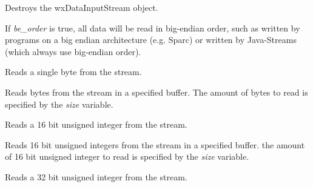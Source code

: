 




Destroys the wxDataInputStream object.



If {\it be\_order} is true, all data will be read in big-endian
order, such as written by programs on a big endian architecture 
(e.g. Sparc) or written by Java-Streams (which always use 
big-endian order).
  


Reads a single byte from the stream.


Reads bytes from the stream in a specified buffer. The amount of
bytes to read is specified by the {\it size} variable.



Reads a 16 bit unsigned integer from the stream.


Reads 16 bit unsigned integers from the stream in a specified buffer. the
amount of 16 bit unsigned integer to read is specified by the {\it size} variable.



Reads a 32 bit unsigned integer from the stream.


